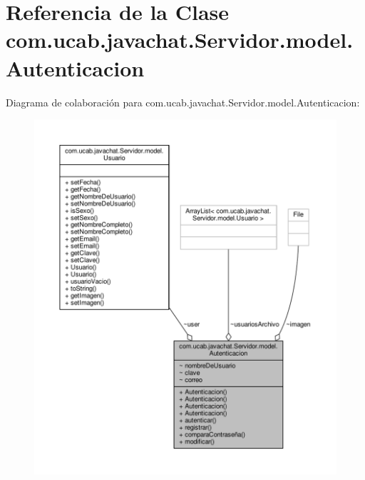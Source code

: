 \hypertarget{classcom_1_1ucab_1_1javachat_1_1_servidor_1_1model_1_1_autenticacion}{\section{Referencia de la Clase com.\-ucab.\-javachat.\-Servidor.\-model.\-Autenticacion}
\label{classcom_1_1ucab_1_1javachat_1_1_servidor_1_1model_1_1_autenticacion}
}


Diagrama de colaboración para com.\-ucab.\-javachat.\-Servidor.\-model.\-Autenticacion\-:
\nopagebreak
\begin{figure}[H]
\begin{center}
\leavevmode
\includegraphics[width=350pt]{dc/dd4/classcom_1_1ucab_1_1javachat_1_1_servidor_1_1model_1_1_autenticacion__coll__graph}
\end{center}
\end{figure}
